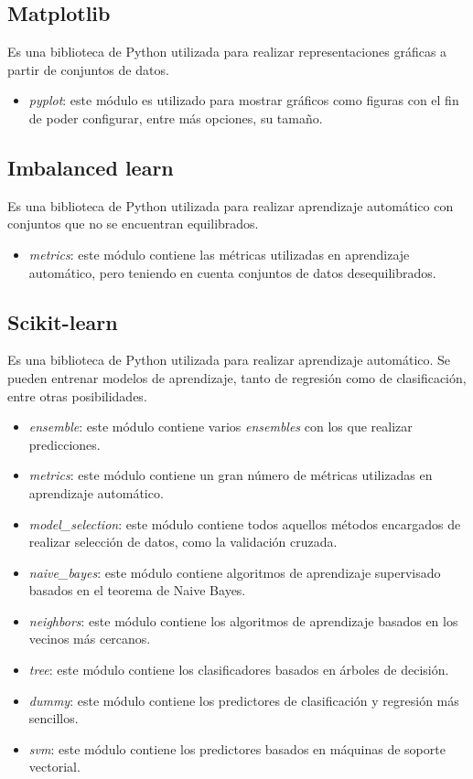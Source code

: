 \subsection{Matplotlib}
Es una biblioteca de Python utilizada para realizar representaciones gráficas a partir de conjuntos de datos.
\begin{itemize}
	\item \textit{pyplot}: este módulo es utilizado para mostrar gráficos como figuras con el fin de poder configurar, entre más opciones, su tamaño. \cite{plt}
\end{itemize}

\subsection{Imbalanced learn}
Es una biblioteca de Python utilizada para realizar aprendizaje automático con conjuntos que no se encuentran equilibrados.
\begin{itemize}
	\item \textit{metrics}: este módulo contiene las métricas utilizadas en aprendizaje automático, pero teniendo en cuenta conjuntos de datos desequilibrados. \cite{imblearn}
\end{itemize}

\subsection{Scikit-learn}
Es una biblioteca de Python utilizada para realizar aprendizaje automático. Se pueden entrenar modelos de aprendizaje, tanto de regresión como de clasificación, entre otras posibilidades.
\begin{itemize}
	\item \textit{ensemble}: este módulo contiene varios \textit{ensembles} con los que realizar predicciones. \cite{skensemble}
	\item \textit{metrics}: este módulo contiene un gran número de métricas utilizadas en aprendizaje automático. \cite{skmetrics}
	\item \textit{model\_selection}: este módulo contiene todos aquellos métodos encargados de realizar selección de datos, como la validación cruzada. \cite{skmodsel}
	\item \textit{naive\_bayes}: este módulo contiene algoritmos de aprendizaje supervisado basados en el teorema de Naive Bayes. \cite{sknbayes}
	\item \textit{neighbors}: este módulo contiene los algoritmos de aprendizaje basados en los vecinos más cercanos. \cite{skneighbors}
	\item \textit{tree}: este módulo contiene los clasificadores basados en árboles de decisión. \cite{sktree}
	\item \textit{dummy}: este módulo contiene los predictores de clasificación y regresión más sencillos.
	\item \textit{svm}: este módulo contiene los predictores basados en máquinas de soporte vectorial. \cite{sksvm}
\end{itemize}

